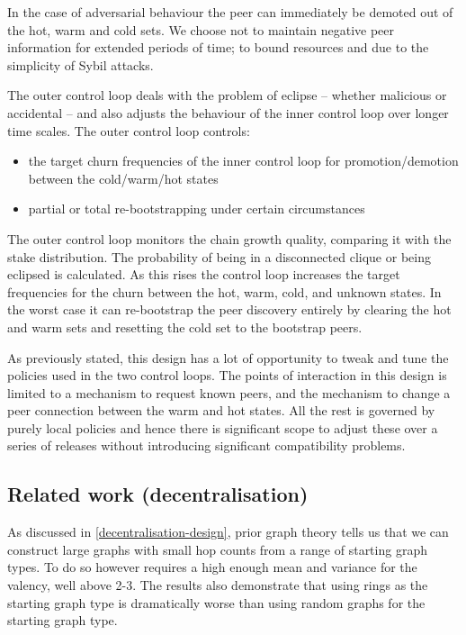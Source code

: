 \documentclass[11pt,a4paper]{article}
\begin{document}
In the case of adversarial behaviour the peer can immediately be demoted
out of the hot, warm and cold sets. We choose not to maintain negative
peer information for extended periods of time; to bound resources and
due to the simplicity of Sybil attacks.

The outer control loop deals with the problem of eclipse -- whether
malicious or accidental -- and also adjusts the behaviour of the inner
control loop over longer time scales. The outer control loop controls:

\begin{itemize}
\item
  the target churn frequencies of the inner control loop for
  promotion/demotion between the cold/warm/hot states
\item
  partial or total re-bootstrapping under certain circumstances
\end{itemize}

The outer control loop monitors the chain growth quality, comparing it
with the stake distribution. The probability of being in a disconnected
clique or being eclipsed is calculated. As this rises the control loop
increases the target frequencies for the churn between the hot, warm,
cold, and unknown states. In the worst case it can re-bootstrap the peer
discovery entirely by clearing the hot and warm sets and resetting the
cold set to the bootstrap peers.

As previously stated, this design has a lot of opportunity to tweak and
tune the policies used in the two control loops. The points of
interaction in this design is limited to a mechanism to request known
peers, and the mechanism to change a peer connection between the warm
and hot states. All the rest is governed by purely local policies and
hence there is significant scope to adjust these over a series of
releases without introducing significant compatibility problems.

\subsection{Related work (decentralisation)}
\label{related-work-decentralisation}

As discussed in \cref{decentralisation-design}, prior graph theory 
\cite{Watts99} tells us that we can construct
large graphs with small hop counts from a range of starting graph types.
To do so however requires a high enough mean and variance for the
valency, well above 2-3. The results also demonstrate that using rings
as the starting graph type is dramatically worse than using random
graphs for the starting graph type.
\end{document}
